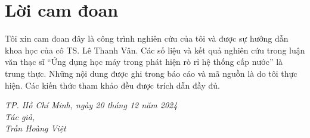\chapter*{Lời cam đoan}
Tôi xin cam đoan đây là công trình nghiên cứu của tôi và được sự hướng dẫn khoa học của cô TS. Lê Thanh Vân. Các số liệu và kết quả nghiên cứu trong luận văn thạc sĩ ``Ứng dụng học máy trong phát hiện rò rỉ hệ thống cấp nước'' là trung thực. Những nội dung được ghi trong báo cáo và mã nguồn là do tôi thực hiện. Các kiến thức tham khảo đều được trích dẫn đầy đủ.
\begin{flushright}
\textit{
TP. Hồ Chí Minh, ngày 20 tháng 12 năm 2024\\
Tác giả,\\
Trần Hoàng Việt
}
\end{flushright}